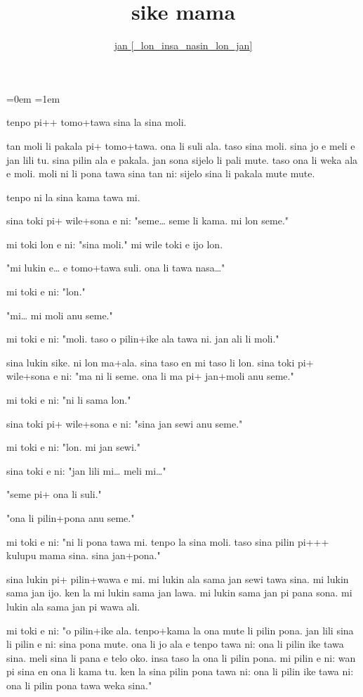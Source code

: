 \documentclass{article}
\title{sike mama}
\author{\href{https://blinry.org/sike-mama/}{jan {[}\_lon\_insa\_nasin\_lon\_jan{]}}}
\date{}
\begin{document}
\parindent=0em
\parskip=1em
\large

\maketitle

tenpo pi++ tomo+tawa sina la sina moli.

tan moli li pakala pi+ tomo+tawa. ona li suli ala. taso sina moli. sina jo e meli e jan lili tu. sina pilin ala e pakala. jan sona sijelo li pali mute. taso ona li weka ala e moli. moli ni li pona tawa sina tan ni: sijelo sina li pakala mute mute.

tenpo ni la sina kama tawa mi.

sina toki pi+ wile+sona e ni: "seme… seme li kama. mi lon seme."

mi toki lon e ni: "sina moli." mi wile toki e ijo lon.

"mi lukin e… e tomo+tawa suli. ona li tawa nasa…"

mi toki e ni: "lon."

"mi… mi moli anu seme."

mi toki e ni: "moli. taso o pilin+ike ala tawa ni. jan ali li moli."

sina lukin sike. ni lon ma+ala. sina taso en mi taso li lon. sina toki pi+ wile+sona e ni: "ma ni li seme. ona li ma pi+ jan+moli anu seme."

mi toki e ni: "ni li sama lon."

sina toki pi+ wile+sona e ni: "sina jan sewi anu seme."

mi toki e ni: "lon. mi jan sewi."

sina toki e ni: "jan lili mi… meli mi…"

"seme pi+ ona li suli."

"ona li pilin+pona anu seme."

mi toki e ni: "ni li pona tawa mi. tenpo la sina moli. taso sina pilin pi+++ kulupu mama sina. sina jan+pona."

sina lukin pi+ pilin+wawa e mi. mi lukin ala sama jan sewi tawa sina. mi lukin sama jan ijo. ken la mi lukin sama jan lawa. mi lukin sama jan pi pana sona. mi lukin ala sama jan pi wawa ali.

mi toki e ni: "o pilin+ike ala. tenpo+kama la ona mute li pilin pona. jan lili sina li pilin e ni: sina pona mute. ona li jo ala e tenpo tawa ni: ona li pilin ike tawa sina. meli sina li pana e telo oko. insa taso la ona li pilin pona. mi pilin e ni: wan pi sina en ona li kama tu. ken la sina pilin pona tawa ni: ona li pilin ike tawa ni: ona li pilin pona tawa weka sina."
\end{document}
